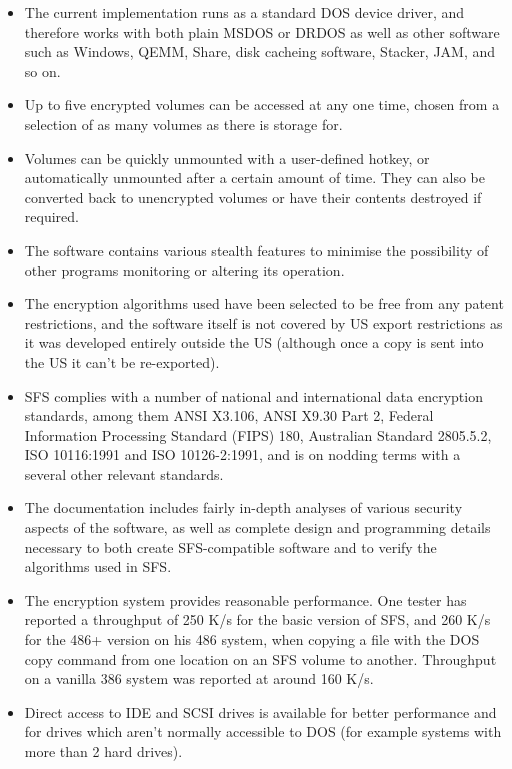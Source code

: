 \begin{itemize}

\item The current implementation runs as a standard DOS device driver, and
    therefore works with both plain MSDOS or DRDOS as well as other
    software such as Windows, QEMM, Share, disk cacheing software, Stacker,
    JAM, and so on.

\item Up to five encrypted volumes can be accessed at any one time, chosen 
    from a selection of as many volumes as there is storage for.

\item Volumes can be quickly unmounted with a user-defined hotkey, or
    automatically unmounted after a certain amount of time.  They can also be
    converted back to unencrypted volumes or have their contents destroyed if
    required.

\item The software contains various stealth features to minimise the
    possibility of other programs monitoring or altering its operation.

\item The encryption algorithms used have been selected to be free from any
    patent restrictions, and the software itself is not covered by US export
    restrictions as it was developed entirely outside the US (although once a
    copy is sent into the US it can't be re-exported).

\item SFS complies with a number of national and international data
    encryption standards, among them ANSI X3.106, ANSI X9.30 Part 2,
    Federal Information Processing Standard (FIPS) 180, Australian
    Standard 2805.5.2, ISO 10116:1991 and ISO 10126-2:1991, and is on
    nodding terms with a several other relevant standards.

\item The documentation includes fairly in-depth analyses of various security
    aspects of the software, as well as complete design and programming details
    necessary to both create SFS-compatible software and to verify the
    algorithms used in SFS.

\item The encryption system provides reasonable performance.  One tester has
    reported a throughput of 250 K/s for the basic version of SFS, and 260 K/s
    for the 486+ version on his 486 system, when copying a file with the DOS
    copy command from one location on an SFS volume to another.  Throughput on
    a vanilla 386 system was reported at around 160 K/s.

\item Direct access to IDE and SCSI drives is available for better
    performance and for drives which aren't normally accessible to DOS (for
    example systems with more than 2 hard drives).

\end{itemize}

